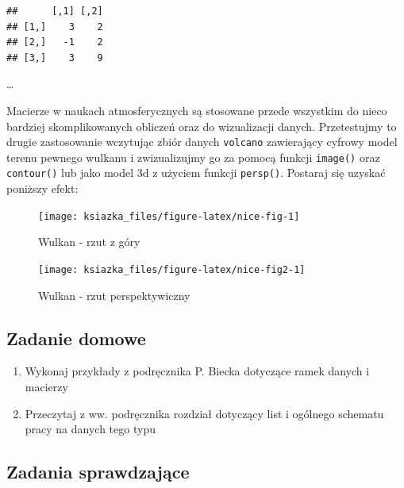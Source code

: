 \documentclass[]{book}
\providecommand{\tightlist}{%
  \setlength{\itemsep}{0pt}\setlength{\parskip}{0pt}}
\theoremstyle{definition}
\theoremstyle{definition}
\theoremstyle{definition}
\theoremstyle{remark}
\begin{document}
\begin{verbatim}
##      [,1] [,2]
## [1,]    3    2
## [2,]   -1    2
## [3,]    3    9
\end{verbatim}

\ldots{}

Macierze w naukach atmosferycznych są stosowane przede wszystkim do
nieco bardziej skomplikowanych obliczeń oraz do wizualizacji danych.
Przetestujmy to drugie zastosowanie wczytując zbiór danych
\texttt{volcano} zawierający cyfrowy model terenu pewnego wulkanu i
zwizualizujmy go za pomocą funkcji \texttt{image()} oraz
\texttt{contour()} lub jako model 3d z użyciem funkcji \texttt{persp()}.
Postaraj się uzyskać poniższy efekt:

\begin{figure}

{\centering \texttt{[image: ksiazka\_files/figure-latex/nice-fig-1]} 

}

\caption{Wulkan - rzut z góry}\label{fig:nice-fig}
\end{figure}

\begin{figure}

{\centering \texttt{[image: ksiazka\_files/figure-latex/nice-fig2-1]} 

}

\caption{Wulkan - rzut perspektywiczny}\label{fig:nice-fig2}
\end{figure}

\subsection*{Zadanie domowe}\label{zadanie-domowe-1}

\begin{enumerate}
\def\labelenumi{\arabic{enumi}.}
\tightlist
\item
  Wykonaj przykłady z podręcznika P. Biecka dotyczące ramek danych i
  macierzy
\item
  Przeczytaj z ww. podręcznika rozdział dotyczący list i ogólnego
  schematu pracy na danych tego typu
\end{enumerate}

\subsection*{Zadania sprawdzające}\label{zadania-sprawdzajace-2}
\end{document}
